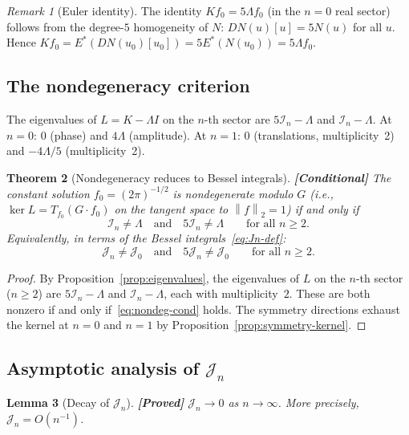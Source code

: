 \documentclass[12pt]{article}
\newtheorem{theorem}{Theorem}[section]
\newtheorem{lemma}[theorem]{Lemma}
\theoremstyle{definition}
\theoremstyle{remark}
\newtheorem{remark}[theorem]{Remark}
\newcommand{\norm}[1]{\left\|#1\right\|}
\newcommand{\proven}{\textbf{\color{teal}[Proved]}}
\newcommand{\conditional}{\textbf{\color{orange}[Conditional]}}
\begin{document}
\begin{remark}[Euler identity]
  The identity $Kf_0=5\Lambda f_0$ (in the $n=0$ real sector) follows from
  the degree-$5$ homogeneity of $N$: $DN(u)[u]=5N(u)$ for all $u$.
  Hence $Kf_0=E^*(DN(u_0)[u_0])=5E^*(N(u_0))=5\Lambda f_0$.
\end{remark}

\subsection{The nondegeneracy criterion}

The eigenvalues of $L=K-\Lambda I$ on the $n$-th sector are
$5\mathcal I_n-\Lambda$ and $\mathcal I_n-\Lambda$.  At $n=0$: $0$ (phase)
and $4\Lambda$ (amplitude).  At $n=1$: $0$ (translations, multiplicity~2) and
$-4\Lambda/5$ (multiplicity~2).

\begin{theorem}[Nondegeneracy reduces to Bessel integrals]
  \label{thm:nondeg-criterion}
  \conditional\quad
  The constant solution $f_0=(2\pi)^{-1/2}$ is nondegenerate modulo
  $G$ (i.e., $\ker L=T_{f_0}(G\cdot f_0)$ on the tangent space to
  $\norm{f}_2=1$) if and only if
  \begin{equation}  \label{eq:nondeg-cond}
    \boxed{
    \mathcal I_n\neq\Lambda
    \quad\text{and}\quad
    5\mathcal I_n\neq\Lambda
    \qquad\text{for all } n\geq 2.}
  \end{equation}
  Equivalently, in terms of the Bessel integrals~\eqref{eq:Jn-def}:
  \[
    \mathcal J_n\neq\mathcal J_0
    \quad\text{and}\quad
    5\mathcal J_n\neq\mathcal J_0
    \qquad\text{for all } n\geq 2.
  \]
\end{theorem}

\begin{proof}
  By Proposition~\ref{prop:eigenvalues}, the eigenvalues of $L$ on the
  $n$-th sector ($n\geq 2$) are $5\mathcal I_n-\Lambda$ and
  $\mathcal I_n-\Lambda$, each with multiplicity~$2$.  These are both
  nonzero if and only if~\eqref{eq:nondeg-cond} holds.  The symmetry
  directions exhaust the kernel at $n=0$ and $n=1$ by
  Proposition~\ref{prop:symmetry-kernel}.
\end{proof}

\subsection{Asymptotic analysis of $\mathcal J_n$}

\begin{lemma}[Decay of $\mathcal J_n$]
  \label{lem:Jn-decay}
  \proven\quad
  $\mathcal J_n\to 0$ as $n\to\infty$.  More precisely,
  $\mathcal J_n=O(n^{-1})$.
\end{lemma}
\end{document}
